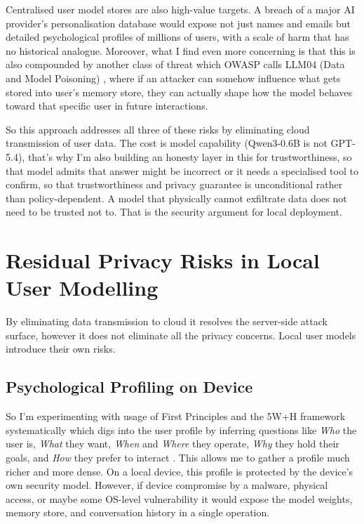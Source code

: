 \documentclass[11pt,a4paper]{article}
\begin{document}
Centralised user model stores are also high-value targets. A breach of a major AI provider's personalisation database would expose not just names and emails but detailed psychological profiles of millions of users, with a scale of harm that has no historical analogue. Moreover, what I find even more concerning is that this is also compounded by another class of threat which OWASP calls LLM04 (Data and Model Poisoning) \cite{owasp2025}, where if an attacker can somehow influence what gets stored into user's memory store, they can actually shape how the model behaves toward that specific user in future interactions.

So this approach addresses all three of these risks by eliminating cloud transmission of user data. The cost is model capability (Qwen3-0.6B \cite{qwen3} is not GPT-5.4), that's why I'm also building an honesty layer in this for trustworthiness, so that model admits that answer might be incorrect or it needs a specialised tool to confirm, so that trustworthiness and privacy guarantee is unconditional rather than policy-dependent. A model that physically cannot exfiltrate data does not need to be trusted not to. That is the security argument for local deployment.

\section{Residual Privacy Risks in Local User Modelling}
\label{sec:privacy}

By eliminating data transmission to cloud it resolves the server-side attack surface, however it does not eliminate all the privacy concerns. Local user models introduce their own risks.

\subsection{Psychological Profiling on Device}

So I'm experimenting with usage of First Principles and the 5W+H framework systematically which digs into the user profile by inferring questions like \textit{Who} the user is, \textit{What} they want, \textit{When} and \textit{Where} they operate, \textit{Why} they hold their goals, and \textit{How} they prefer to interact \cite{taranekar2025}. This allows me to gather a profile much richer and more dense. On a local device, this profile is protected by the device's own security model. However, if device compromise by a malware, physical access, or maybe some OS-level vulnerability it would expose the model weights, memory store, and conversation history in a single operation.
\end{document}
